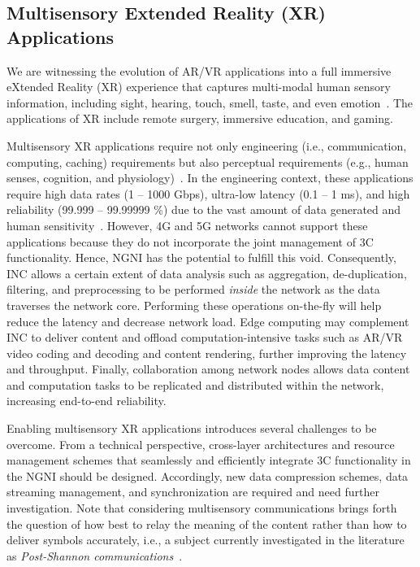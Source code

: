  \subsection{Multisensory Extended Reality (XR) Applications}
 
\noindent We are witnessing the evolution of AR/VR applications into a full immersive eXtended Reality (XR) experience that captures multi-modal human sensory information, including sight, hearing, touch, smell, taste, and even emotion~\cite{8869705,9369324}. The applications of XR include remote surgery, immersive education, and gaming.

Multisensory XR applications require not only engineering (i.e., communication, computing, caching) requirements but also perceptual requirements (e.g., human senses, cognition, and physiology)~\cite{8869705,9369324}. In the engineering context, these applications require high data rates (1 -- 1000 Gbps), ultra-low latency (0.1 -- 1 ms), and high reliability (99.999 -- 99.99999 \%) due to the vast amount of data generated and human sensitivity~\cite{8329628,9369324}. However,  4G and 5G networks cannot support these applications because they do not incorporate the joint management of 3C functionality. 
Hence, NGNI has the potential to fulfill this void. Consequently, INC allows a certain extent of data analysis such as aggregation, de-duplication, filtering, and preprocessing to be performed \textit{inside} the network as the data traverses the network core. Performing these operations on-the-fly will help reduce the latency and decrease network load. Edge computing may complement INC to deliver content and offload computation-intensive tasks such as AR/VR video coding and decoding and content rendering, further improving the latency and throughput. Finally, collaboration among network nodes allows data content and computation tasks to be replicated and distributed within the network, increasing end-to-end reliability.

Enabling multisensory XR applications introduces several challenges to be overcome.  From a technical perspective,  cross-layer architectures and resource management schemes that seamlessly and efficiently integrate 3C functionality in the NGNI should be designed.  Accordingly, new data compression schemes, data streaming management, and synchronization are required and need further investigation.  Note that considering multisensory communications brings forth the question of how best to relay the meaning of the content rather than how to deliver symbols accurately, i.e., a subject currently investigated in the literature as \textit{Post-Shannon communications}~\cite{CALVANESESTRINATI2021107930}.

